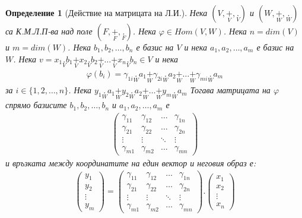 \documentclass[12pt]{article}
\newtheorem{definition}{Определение}%
\begin{document}
\begin{definition}[Действие на матрицата на Л.И.]
Нека \((V, \underset{V}{+}, \underset{V}{.})\) и \((W, \underset{W}{+}, \underset{W}{.})\) са К.М.Л.П-ва над поле \((F, \underset{F}{+}, \underset{F}{.})\).
Нека \(\varphi \in Hom(V, W)\).
Нека \(n = dim(V)\) и \(m = dim(W)\).
Нека \(b_1, b_2, \dots, b_n\) е базис на \(V\)
и нека \(a_1, a_2, \dots, a_m\) е базис на \(W\).
Нека \(v = x_1\underset{V}{.}b_1 \underset{V}{+} x_2\underset{V}{.}b_2 \underset{V}{+} \dots \underset{V}{+} x_n\underset{V}{.}b_n \in V\)
и нека 
\begin{align*}
\varphi(b_i) = \gamma_{1i}\underset{W}{.}a_1 \underset{W}{+} \gamma_{2i}\underset{W}{.}a_2 \underset{W}{+} \dots \underset{W}{+} \gamma_{mi}\underset{W}{.}a_m
\end{align*}
за \(i \in \{1, 2, \dots, n\}\).
Нека \(y_1\underset{W}{.}a_1 \underset{W}{+} y_2\underset{W}{.}a_2 \underset{W}{+} \dots \underset{W}{+} y_m\underset{W}{.}a_m\)
Тогава матрицата на \(\varphi\)
спрямо базисите \(b_1, b_2, \dots, b_n\) и \(a_1, a_2, \dots, a_m\) е
\begin{align*}
\begin{pmatrix}
    \gamma_{11} & \gamma_{12} & \dots & \gamma_{1n} \\
    \gamma_{21} & \gamma_{22} & \dots & \gamma_{2n} \\
    \vdots    & \vdots  & \ddots & \vdots \\
    \gamma_{m1} & \gamma_{m2} & \dots & \gamma_{mn}
\end{pmatrix}
\end{align*}
и връзката между координатите на един вектор и неговия образ е:
\begin{align*}
\begin{pmatrix}
y_1 \\
y_2 \\
\vdots \\
y_m
\end{pmatrix}
=
\begin{pmatrix}
    \gamma_{11} & \gamma_{12} & \dots & \gamma_{1n} \\
    \gamma_{21} & \gamma_{22} & \dots & \gamma_{2n} \\
    \vdots    & \vdots  & \ddots & \vdots \\
    \gamma_{m1} & \gamma_{m2} & \dots & \gamma_{mn}
\end{pmatrix}
.
\begin{pmatrix}
x_1 \\
x_2 \\
\vdots \\
x_n
\end{pmatrix}
\end{align*}
\end{definition}
\end{document}
